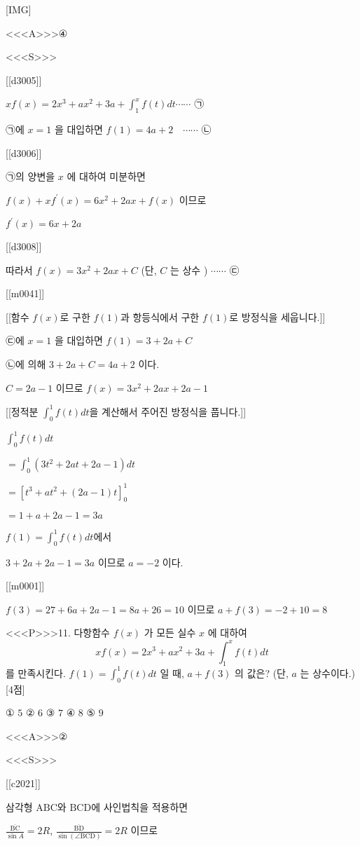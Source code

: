 \documentclass{oblivoir}
\begin{document}
[IMG]

<<<A>>>④

<<<S>>>

[[d3005]]

$x f(x)=2 x^{3}+a x^{2}+3 a+\int_{1}^{x} f(t) d t \cdots \cdots$ ㉠

㉠에 $x=1$ 을 대입하면 $f(1)=4 a+2 \quad \cdots \cdots$ ㉡

[[d3006]]

㉠의 양변을 $x$ 에 대하여 미분하면

$f(x)+x f^{\prime}(x)=6 x^{2}+2 a x+f(x) $ 이므로

$f^{\prime}(x)=6 x+2 a$

[[d3008]]

따라서 $f(x)=3 x^{2}+2 a x+C$ (단, $C$ 는 상수 ) $\cdots \cdots$  ㉢

[[m0041]]

[[함수 $f(x)$로 구한 $f(1)$과 항등식에서 구한 $f(1)$로 방정식을 세웁니다.]] 

㉢에 $x=1$ 을 대입하면 $f(1)=3+2 a+C$

㉡에 의해 $3+2 a+C=4 a+2$ 이다.

$C=2 a-1 $ 이므로 $f(x)=3 x^{2}+2 a x+2 a-1$

[[정적분 $\int_{0}^{1} f(t) d t$을 계산해서 주어진 방정식을 풉니다.]]

$\int_{0}^{1} f(t) d t $

$=\int_{0}^{1}\left(3 t^{2}+2 a t+2 a-1\right) d t$

$=\left[t^{3}+a t^{2}+(2 a-1) t\right]_{0}^{1}$

$=1+a+2 a-1=3 a$

$f(1)=\int_{0}^{1} f(t) d t$에서

$3+2 a+2 a-1=3 a$ 이므로 $a=-2$ 이다.

[[m0001]]

$f(3)=27+6 a+2 a-1=8 a+26=10$ 이므로 $a+f(3)=-2+10=8$


<<<P>>>11. 다항함수 $f(x)$ 가 모든 실수 $x$ 에 대하여
$$
x f(x)=2 x^{3}+a x^{2}+3 a+\int_{1}^{x} f(t) d t
$$
를 만족시킨다. $f(1)=\int_{0}^{1} f(t) d t$ 일 때, $a+f(3)$ 의 값은? (단, $a$ 는 상수이다.) [4점]

① $5$
② $6$
③ $7$
④ $8$
⑤ $9$

<<<A>>>②

<<<S>>>

[[c2021]]

삼각형 $\mathrm{ABC}$와 $\mathrm{BCD}$에 사인법칙을 적용하면 

$\frac{\overline{\mathrm{BC}}}{\sin A}=2R$, $\frac{\overline{\mathrm{BD}}}{\sin (\angle \mathrm{BCD})} =2R$ 이므로
\end{document}
